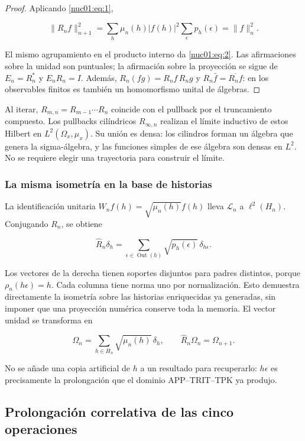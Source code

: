 \begin{proof}
Aplicando \eqref{nuc01:eq:1},

\[
\|R_nf\|_{n+1}^2
=\sum_h\mu_n(h)|f(h)|^2\sum_\epsilon p_h(\epsilon)
=\|f\|_n^2.
\]

El mismo agrupamiento en el producto interno da \eqref{nuc01:eq:2}. Las afirmaciones sobre la unidad son puntuales; la afirmación sobre la proyección se sigue de \(E_n=R_n^*\) y \(E_nR_n=I\). Además, \(R_n(fg)=R_nf\,R_ng\) y \(R_n\bar f=\overline{R_nf}\): en los observables finitos es también un homomorfismo unital de álgebras.
\end{proof}

Al iterar, \(R_{m,n}=R_{m-1}\cdots R_n\) coincide con el pullback por el truncamiento compuesto. Los pullbacks cilíndricos \(R_{\infty,n}\) realizan el límite inductivo de estos Hilbert en \(L^2(\Omega_x,\mu_x)\). Su unión es densa: los cilindros forman un álgebra que genera la sigma-álgebra, y las funciones simples de ese álgebra son densas en \(L^2\). No se requiere elegir una trayectoria para construir el límite.

\subsubsection{La misma isometría en la base de historias}

La identificación unitaria \(W_nf(h)=\sqrt{\mu_n(h)}f(h)\) lleva \(\mathscr L_n\) a \(\ell^2(H_n)\). Conjugando \(R_n\), se obtiene

\begin{equation}
\widehat R_n\delta_h
=\sum_{\epsilon\in\operatorname{Out}(h)}\sqrt{p_h(\epsilon)}\,\delta_{h\epsilon}.
\label{nuc01:eq:3}
\end{equation}

Los vectores de la derecha tienen soportes disjuntos para padres distintos, porque \(\rho_n(h\epsilon)=h\). Cada columna tiene norma uno por normalización. Esto demuestra directamente la isometría sobre las historias enriquecidas ya generadas, sin imponer que una proyección numérica conserve toda la memoria. El vector unidad se transforma en

\[
\Omega_n=\sum_{h\in H_n}\sqrt{\mu_n(h)}\,\delta_h,
\qquad \widehat R_n\Omega_n=\Omega_{n+1}.
\]

No se añade una copia artificial de \(h\) a un resultado para recuperarlo: \(h\epsilon\) es precisamente la prolongación que el dominio APP–TRIT–TPK ya produjo.

\subsection{Prolongación correlativa de las cinco operaciones}

